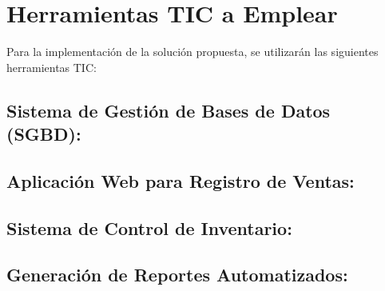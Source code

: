 \documentclass{article}
\newenvironment{herramientasTicAEmplear}{}{}
\begin{document}
\begin{herramientasTicAEmplear}
  
  \section{Herramientas TIC a Emplear}

  Para la implementación de la solución propuesta, se utilizarán las siguientes herramientas TIC:

  \subsection{Sistema de Gestión de Bases de Datos (SGBD):}

  \subsection{Aplicación Web para Registro de Ventas:}

  \subsection{Sistema de Control de Inventario:}

  \subsection{Generación de Reportes Automatizados:}

\end{herramientasTicAEmplear}
\end{document}
